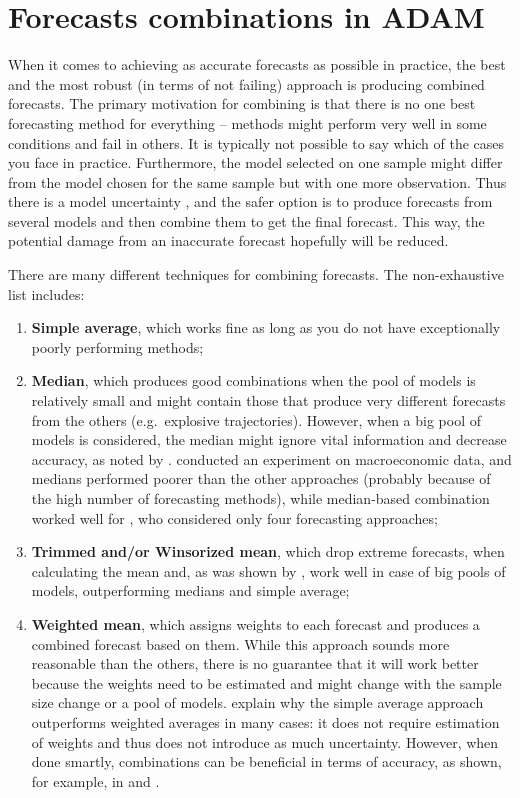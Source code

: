 \documentclass[
]{book}
\providecommand{\tightlist}{%
  \setlength{\itemsep}{0pt}\setlength{\parskip}{0pt}}
\theoremstyle{definition}
\theoremstyle{definition}
\theoremstyle{definition}
\theoremstyle{definition}
\theoremstyle{remark}
\begin{document}
\hypertarget{ADAMCombinations}{%
\section{Forecasts combinations in ADAM}\label{ADAMCombinations}}

When it comes to achieving as accurate forecasts as possible in practice, the best and the most robust (in terms of not failing) approach is producing combined forecasts. The primary motivation for combining is that there is no one best forecasting method for everything -- methods might perform very well in some conditions and fail in others. It is typically not possible to say which of the cases you face in practice. Furthermore, the model selected on one sample might differ from the model chosen for the same sample but with one more observation. Thus there is a model uncertainty \citep[as defined by][]{Chatfield1996}, and the safer option is to produce forecasts from several models and then combine them to get the final forecast. This way, the potential damage from an inaccurate forecast hopefully will be reduced.

There are many different techniques for combining forecasts. The non-exhaustive list includes:

\begin{enumerate}
\def\labelenumi{\arabic{enumi}.}
\tightlist
\item
  \textbf{Simple average}, which works fine as long as you do not have exceptionally poorly performing methods;
\item
  \textbf{Median}, which produces good combinations when the pool of models is relatively small and might contain those that produce very different forecasts from the others (e.g.~explosive trajectories). However, when a big pool of models is considered, the median might ignore vital information and decrease accuracy, as noted by \citet{Jose2008}. \citet{Stock2004} conducted an experiment on macroeconomic data, and medians performed poorer than the other approaches (probably because of the high number of forecasting methods), while median-based combination worked well for \citet{Petropoulos2020}, who considered only four forecasting approaches;
\item
  \textbf{Trimmed and/or Winsorized mean}, which drop extreme forecasts, when calculating the mean and, as was shown by \citet{Jose2008}, work well in case of big pools of models, outperforming medians and simple average;
\item
  \textbf{Weighted mean}, which assigns weights to each forecast and produces a combined forecast based on them. While this approach sounds more reasonable than the others, there is no guarantee that it will work better because the weights need to be estimated and might change with the sample size change or a pool of models. \citet{Claeskens2016} explain why the simple average approach outperforms weighted averages in many cases: it does not require estimation of weights and thus does not introduce as much uncertainty. However, when done smartly, combinations can be beneficial in terms of accuracy, as shown, for example, in \citet{Kolassa2011} and \citet{Kourentzes2019c}.
\end{enumerate}
\end{document}

